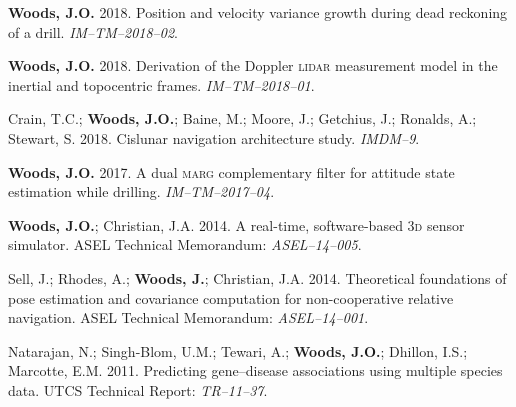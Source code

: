\documentclass[12pt,letterpaper]{article}
\newcommand{\mhead}[1]{\leavevmode\marginpar{\sffamily\footnotesize #1}}
\begin{document}
\medskip
\par \textbf{Woods, J.O.} 2018. Position and velocity variance growth during dead reckoning of a drill. \textit{IM--TM--2018--02}.

\medskip
\par \textbf{Woods, J.O.} 2018. Derivation of the Doppler \textsc{lidar} measurement model in the inertial and topocentric frames. \textit{IM--TM--2018--01}.

\medskip
\par Crain, T.C.; \textbf{Woods, J.O.}; Baine, M.; Moore, J.; Getchius, J.; Ronalds, A.; Stewart, S. 2018. Cislunar navigation architecture study. \textit{IMDM--9}.

\medskip
\par \textbf{Woods, J.O.} 2017. A dual \textsc{marg} complementary filter for attitude state estimation while drilling. \textit{IM--TM--2017--04}.

\medskip
\par \textbf{Woods, J.O.}; Christian, J.A. 2014. A real-time, software-based \textsc{3d} sensor simulator. ASEL Technical Memorandum: \textit{ASEL--14--005}.

\medskip
\par Sell, J.; Rhodes, A.; \textbf{Woods, J.}; Christian, J.A. 2014. Theoretical foundations of pose estimation and covariance computation for non-cooperative relative navigation. ASEL Technical Memorandum: \textit{ASEL--14--001}.

\medskip
\par Natarajan, N.; Singh-Blom, U.M.; Tewari, A.; \textbf{Woods, J.O.}; Dhillon, I.S.; Marcotte, E.M. 2011. Predicting gene--disease associations using multiple species data. UTCS Technical Report: \textit{TR--11--37}.


%
\end{document}

